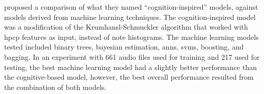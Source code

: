 \textcite{gomez2004estimating} proposed a comparison of what
they named ``cognition-inspired'' models, against models
derived from machine learning techniques. The
cognition-inspired model was a modification of the
Krumhansl-Schmuckler algorithm that worked with
\acrfull{hpcp} features as input, instead of note
histograms. The machine learning models tested included
binary trees, bayesian estimation, \glspl{ann}, \glspl{svm},
boosting, and bagging. In an experiment with 661 audio files
used for training and 217 used for testing, the best machine
learning model had a slightly better performance than the
cognitive-based model, however, the best overall performance
resulted from the combination of both models.





